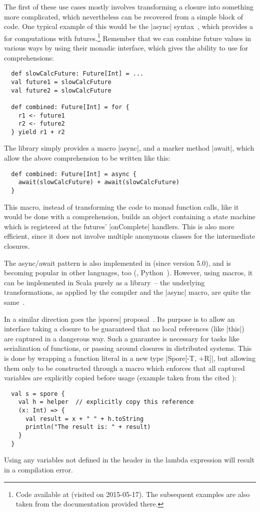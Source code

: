 The first of these use cases mostly involves transforming a closure into something more complicated,
which nevertheless can be recovered from a simple block of code. One typical example of this would
be the |async| syntax~\cite{haller2013:async}, which provides a \dsl{} for computations with
futures.\footnote{Code available at
  \protect{}
  (visited on 2015-05-17). The subsequent examples are also taken from the documentation provided
  there.} Remember that we can combine future values in various ways by using their monadic
interface, which gives the ability to use for comprehensions:
\begin{lstlisting}
  def slowCalcFuture: Future[Int] = ...
  val future1 = slowCalcFuture
  val future2 = slowCalcFuture

  def combined: Future[Int] = for {
    r1 <- future1
    r2 <- future2
  } yield r1 + r2
\end{lstlisting}
The library simply provides a macro |async|, and a marker method |await|, which allow the above
comprehension to be written like this:
\begin{lstlisting}
  def combined: Future[Int] = async {
    await(slowCalcFuture) + await(slowCalcFuture)
  }
\end{lstlisting}
This macro, instead of transforming the code to monad function calls, like it would be done with a
comprehension, builds an object containing a state machine which is registered at the futures'
|onComplete| handlers. This is also more efficient, since it does not involve multiple anonymous
classes for the intermediate closures.

The async/await pattern is also implemented in \csharp{} (since version 5.0), and is becoming
popular in other languages, too (\eg, Python~\cite{selivanov2015:coroutines}). However,
using macros, it can be implemented in Scala purely as a library~-- the underlying transformations,
as applied by the \csharp{} compiler and the |async| macro, are quite the
same~\cite{torgerson2010:asynchronous}.

In a similar direction goes the |spores| proposal~\cite{miller2013:spores}. Its purpose is to allow
an interface taking a closure to be guaranteed that no local references (like |this|) are captured
in a dangerous way. Such a guarantee is necessary for tasks like serialization of functions, or
passing around closures in distributed systems. This is done by wrapping a function literal in a new
type |Spore[-T, +R]|, but allowing them only to be constructed through a macro which enforces that
all captured variables are explicitly copied before usage (example taken from the cited
):
\begin{lstlisting}
  val s = spore {
    val h = helper  // explicitly copy this reference
    (x: Int) => {
      val result = x + " " + h.toString
      println("The result is: " + result)
    }
  }
\end{lstlisting}
Using any variables not defined in the header in the lambda expression will result in a compilation
error.

